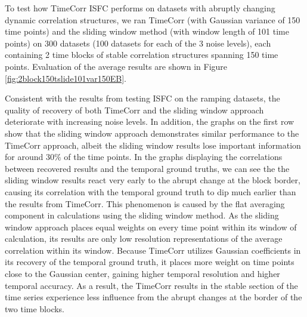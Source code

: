 \documentclass[11pt]{article}
\begin{document}
To test how TimeCorr ISFC performs on datasets with abruptly changing dynamic correlation structures, we ran TimeCorr (with Gaussian variance of 150 time points) and the sliding window method (with window length of 101 time points) on 300 datasets (100 datasets for each of the 3 noise levels), each containing 2 time blocks of stable correlation structures spanning 150 time points. Evaluation of the average results are shown in Figure \ref{fig:2block150tslide101var150EB}.

Consistent with the results from testing ISFC on the ramping datasets, the quality of recovery of both TimeCorr and the sliding window approach deteriorate with increasing noise levels. In addition, the graphs on the first row show that the sliding window approach demonstrates similar performance to the TimeCorr approach, albeit the sliding window results lose important information for around $30\%$ of the time points. In the graphs displaying the correlations between recovered results and the temporal ground truths, we can see the the sliding window results react very early to the abrupt change at the block border, causing its correlation with the temporal ground truth to dip much earlier than the results from TimeCorr. This phenomenon is caused by the flat averaging component in calculations using the sliding window method. As the sliding window approach places equal weights on every time point within its window of calculation, its results are only low resolution representations of the average correlation within its window. Because TimeCorr utilizes Gaussian coefficients in its recovery of the temporal ground truth, it places more weight on time points close to the Gaussian center, gaining higher temporal resolution and higher temporal accuracy. As a result, the TimeCorr results in the stable section of the time series experience less influence from the abrupt changes at the border of the two time blocks.
\end{document}
